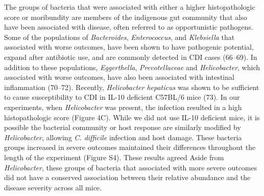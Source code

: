 \documentclass[
  12pt,
]{article}
\begin{document}
The groups of bacteria that were associated with either a higher
histopathologic score or moribundity are members of the indigenous gut
community that also have been associated with disease, often referred to
as opportunistic pathogens. Some of the populations of
\emph{Bacteroides}, \emph{Enterococcus}, and \emph{Klebsiella} that
associated with worse outcomes, have been shown to have pathogenic
potential, expand after antibiotic use, and are commonly detected in CDI
cases (66--69). In addition to these populations, \emph{Eggerthella},
\emph{Prevotellaceae} and \emph{Helicobacter}, which associated with
worse outcomes, have also been associated with intestinal inflammation
(70--72). Recently, \emph{Helicobacter hepaticus} was shown to be
sufficient to cause susceptibility to CDI in IL-10 deficient C57BL/6
mice (73). In our experiments, when \emph{Helicobacter} was present, the
infection resulted in a high histopathologic score (Figure 4C). While we
did not use IL-10 deficient mice, it is possible the bacterial community
or host response are similarly modified by \emph{Helicobacter}, allowing
\emph{C. difficile} infection and host damage. These bacteria groups
increased in severe outcomes maintained their differences throughout the
length of the experiment (Figure S4). These results agreed Aside from
\emph{Helicobacter}, these groups of bacteria that associated with more
severe outcomes did not have a conserved association between their
relative abundance and the disease severity across all mice.
\end{document}
